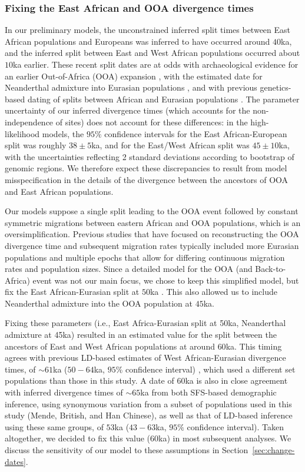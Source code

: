 \documentclass[]{article}
\begin{document}
\subsubsection{Fixing the East African and OOA divergence times}

In our preliminary models, the unconstrained inferred split times between East
African populations and Europeans was inferred to have occurred around $40$ka,
and the inferred split between East and West African populations occurred about
$10$ka earlier. These recent split dates are at odds with archaeological
evidence for an earlier Out-of-Africa (OOA) expansion
\citep[e.g.]{Fu2014-am,Hublin2020-nk,Hajdinjak2021-jo}, with the estimated date
for Neanderthal admixture into Eurasian populations
\citep[e.g.][]{Reilly2022-ym}, and with previous genetics-based dating of
splits between African and Eurasian populations
\citep[e.g.]{Gutenkunst2009-ff,Jouganous2017-pq,Kamm2020-vn}. The parameter
uncertainty of our inferred divergence times (which accounts for the
non-independence of sites) does not account for these differences: in the
high-likelihood models, the $95\%$ confidence intervals for the East
African-European split was roughly $38 \pm 5$ka, and for the East/West African
split was $45 \pm 10$ka, with the uncertainties reflecting 2 standard
deviations according to bootstrap of genomic regions. We therefore expect these
discrepancies to result from model misspecification in the details of the
divergence between the ancestors of OOA and East African populations.

Our models suppose a single split leading to the OOA event followed by constant
symmetric migrations between eastern African and OOA populations, which is an
oversimplification. Previous studies that have focused on reconstructing the
OOA divergence time and subsequent migration rates typically included more
Eurasian populations and multiple epochs that allow for differing continuous
migration rates and population sizes. Since a detailed model for the OOA (and
Back-to-Africa) event was not our main focus, we chose to keep this simplified
model, but fix the East African-Eurasian split at $50$ka
\citep{Fewlass2020-se,Hublin2020-nk}. This also allowed us to include
Neanderthal admixture into the OOA population at $45$ka.

Fixing these parameters (i.e., East Africa-Eurasian split at 50ka, Neanderthal
admixture at 45ka) resulted in an estimated value for the split between the
ancestors of East and West African populations at around $60$ka. This timing
agrees with previous LD-based estimates of West African-Eurasian divergence
times, of $\sim61$ka ($50-64$ka, $95\%$ confidence interval)
\citep{Ragsdale2019-nt}, which used a different set populations than those in
this study. A date of $60$ka is also in close agreement with inferred
divergence times of $\sim65$ka from both SFS-based demographic inference, using
synonymous variation from a subset of populations used in this study (Mende,
British, and Han Chinese), as well as that of LD-based inference using these
same groups, of $53$ka ($43-63$ka, $95\%$ confidence interval). Taken
altogether, we decided to fix this value ($60$ka) in most subsequent analyses.
We discuss the sensitivity of our model to these assumptions in
Section~\ref{sec:change-dates}.
\end{document}
